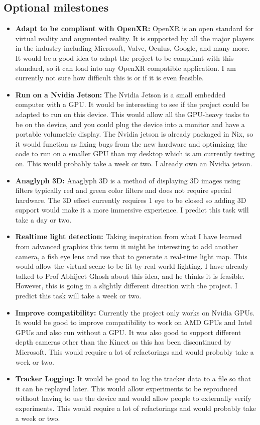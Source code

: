 \subsection{Optional milestones}
\begin{itemize}
    \item \textbf{Adapt to be compliant with OpenXR:} OpenXR is an open standard for virtual reality and augmented reality. It is supported by all the major players in the industry including Microsoft, Valve, Oculus, Google, and many more. It would be a good idea to adapt the project to be compliant with this standard, so it can load into any OpenXR compatible application. I am currently not sure how difficult this is or if it is even feasible.

    \item \textbf{Run on a Nvidia Jetson:} The Nvidia Jetson is a small embedded computer with a GPU. It would be interesting to see if the project could be adapted to run on this device. This would allow all the GPU-heavy tasks to be on the device, and you could plug the device into a monitor and have a portable volumetric display. The Nvidia jetson is already packaged in Nix, so it would function as fixing bugs from the new hardware and optimizing the code to run on a smaller GPU than my desktop which is am currently testing on. This would probably take a week or two. I already own an Nvidia jetson.

    \item \textbf{Anaglyph 3D:} Anaglyph 3D is a method of displaying 3D images using filters typically red and green color filters and does not require special hardware. The 3D effect currently requires 1 eye to be closed so adding 3D support would make it a more immersive experience. I predict this task will take a day or two.

    \item \textbf{Realtime light detection:} Taking inspiration from what I have learned from advanced graphics this term it might be interesting to add another camera, a fish eye lens and use that to generate a real-time light map. This would allow the virtual scene to be lit by real-world lighting. I have already talked to Prof Abhijeet Ghosh about this idea, and he thinks it is feasible. However, this is going in a slightly different direction with the project. I predict this task will take a week or two.

    \item \textbf{Improve compatibility:} Currently the project only works on Nvidia GPUs. It would be good to improve compatibility to work on AMD GPUs and Intel GPUs and also run without a GPU. It was also good to support different depth cameras other than the Kinect as this has been discontinued by Microsoft. This would require a lot of refactorings and would probably take a week or two.

    \item \textbf{Tracker Logging:} It would be good to log the tracker data to a file so that it can be replayed later. This would allow experiments to be reproduced without having to use the device and would allow people to externally verify experiments. This would require a lot of refactorings and would probably take a week or two.
\end{itemize}